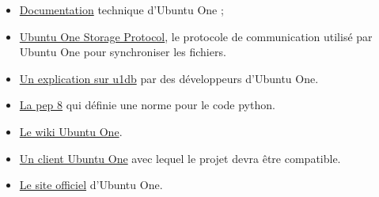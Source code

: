 \begin{itemize}
\renewcommand{\labelitemi}{$\bullet$}
\item \href{https://wiki.ubuntu.com/UbuntuOne/TechnicalDetails}{Documentation} technique d'Ubuntu One ;
\item \href{http://bazaar.launchpad.net/~ubuntuone-control-tower/ubuntuone-storage-protocol/trunk/files}{Ubuntu One Storage Protocol}, le protocole de communication utilisé par Ubuntu One pour synchroniser les fichiers.
\item \href{https://github.com/onitu/Epitech.EIP/wiki/Discussion-du-03-03-13-avec-Chipaca-sur-\%23u1db}{Un explication sur u1db} par des développeurs d'Ubuntu One.
\item \href{http://www.python.org/dev/peps/pep-0008/}{La pep 8} qui définie une
norme pour le code python.
\item \href{https://wiki.ubuntu.com/UbuntuOne}{Le wiki Ubuntu One}.
\item
\href{http://bazaar.launchpad.net/~ubuntuone-control-tower/ubuntuone-client-gnome/trunk/files}{Un
client Ubuntu One} avec lequel le projet devra être compatible.
\item \href{https://one.ubuntu.com/dashboard/}{Le site officiel} d'Ubuntu One.
\end{itemize}
